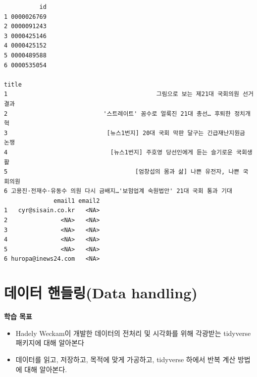 \documentclass[
  11pt,
]{krantz}
\newenvironment{Shaded}{\begin{snugshade}}{\end{snugshade}}
\newcommand{\CommentTok}[1]{\textcolor[rgb]{0.37,0.37,0.37}{\textit{#1}}}
\providecommand{\tightlist}{%
  \setlength{\itemsep}{0pt}\setlength{\parskip}{0pt}}
\let\BeginKnitrBlock\begin \let\EndKnitrBlock\end
\begin{document}
\begin{verbatim}
          id
1 0000026769
2 0000091243
3 0000425146
4 0000425152
5 0000489588
6 0000535054
                                                                             title
1                                          그림으로 보는 제21대 국회의원 선거 결과
2                           '스트레이트' 꼼수로 얼룩진 21대 총선… 후퇴한 정치개혁
3                            [뉴스1번지] 20대 국회 막판 달구는 긴급재난지원금 논쟁
4                             [뉴스1번지] 주호영 당선인에게 듣는 슬기로운 국회생활
5                                    [엄창섭의 몸과 삶] 나쁜 유전자, 나쁜 국회의원
6 고용진·전재수·유동수 의원 다시 금배지…'보험업계 숙원법안' 21대 국회 통과 기대
              email1 email2
1   cyr@sisain.co.kr   <NA>
2               <NA>   <NA>
3               <NA>   <NA>
4               <NA>   <NA>
5               <NA>   <NA>
6 huropa@inews24.com   <NA>
\end{verbatim}

\begin{Shaded}
\end{Shaded}

\normalsize

\hypertarget{data-handling}{%
\chapter{데이터 핸들링(Data handling)}\label{data-handling}}

\footnotesize

\BeginKnitrBlock{rmdimportant}
\textbf{학습 목표}

\begin{itemize}
\tightlist
\item
  Hadely Weckam이 개발한 데이터의 전처리 및 시각화를 위해 각광받는 tidyverse 패키지에 대해 알아본다
\item
  데이터를 읽고, 저장하고, 목적에 맞게 가공하고, tidyverse 하에서 반복 계산 방법에 대해 알아본다.
\end{itemize}
\EndKnitrBlock{rmdimportant}
\end{document}
